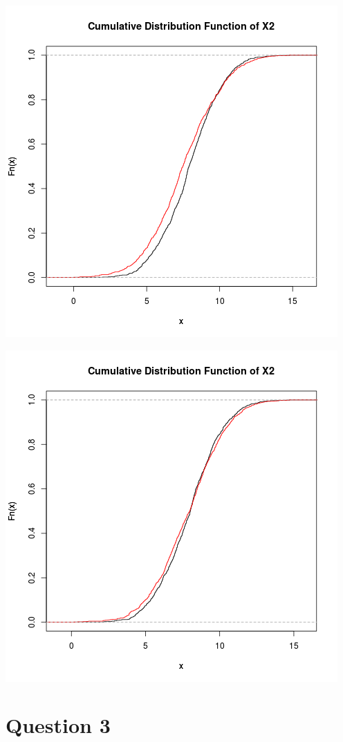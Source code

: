 \documentclass{article}
\begin{document}
\includegraphics{"plot2_5"}
\pagebreak

\includegraphics{"plot2_6"}
\pagebreak


\section{Question 3}
\end{document}
